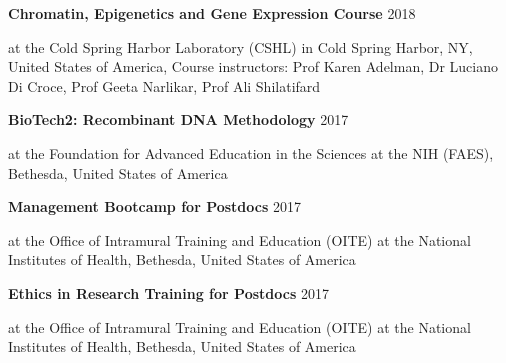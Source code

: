 \documentclass[margin,line]{res}
\begin{document}
\begin{resume}
\vspace*{-2mm}

{\bf Chromatin, Epigenetics and Gene Expression Course} \hfill {2018}\\
\vspace*{-3.5mm}
\begin{addmargin}[0pt]{.1\linewidth}
\vspace*{-1mm}
at the Cold Spring Harbor Laboratory (CSHL) in Cold Spring Harbor, NY, United States of America, Course instructors: Prof Karen Adelman, Dr Luciano Di Croce, Prof Geeta Narlikar, Prof Ali Shilatifard
\end{addmargin}

\vspace*{-2mm}

{\bf BioTech2: Recombinant DNA Methodology} \hfill {2017}\\
\vspace*{-3.5mm}
\begin{addmargin}[0pt]{.1\linewidth}
\vspace*{-1mm}
at the Foundation for Advanced Education in the Sciences at the NIH (FAES), Bethesda, United States of America
\end{addmargin}

\vspace*{-2mm}

{\bf Management Bootcamp for Postdocs} \hfill {2017}\\
\vspace*{-3.5mm}
\begin{addmargin}[0pt]{.1\linewidth}
\vspace*{-1mm}
at the Office of Intramural Training and Education (OITE) at the National Institutes of Health, Bethesda, United States of America
\end{addmargin}

\vspace*{-2mm}

{\bf Ethics in Research Training for Postdocs} \hfill {2017}\\
\vspace*{-3.5mm}
\begin{addmargin}[0pt]{.1\linewidth}
\vspace*{-1mm}
at the Office of Intramural Training and Education (OITE) at the National Institutes of Health, Bethesda, United States of America
\end{addmargin}

\vspace*{-2mm}


\end{resume}
\end{document}

